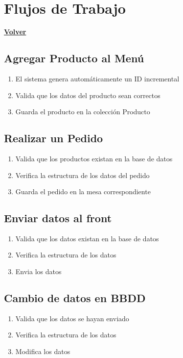 \documentclass[12pt]{article}
\begin{document}
\clearpage

\section{Flujos de Trabajo}
\hyperlink{anchor-indice}{\textbf{Volver}}\\

\subsection{Agregar Producto al Menú}
\begin{enumerate}
    \item El sistema genera automáticamente un ID incremental
    \item Valida que los datos del producto sean correctos
    \item Guarda el producto en la colección Producto
\end{enumerate}

\subsection{Realizar un Pedido}
\begin{enumerate}
    \item Valida que los productos existan en la base de datos
    \item Verifica la estructura de los datos del pedido
    \item Guarda el pedido en la mesa correspondiente
\end{enumerate}

\subsection{Enviar datos al front}
\begin{enumerate}
    \item Valida que los datos existan en la base de datos
    \item Verifica la estructura de los datos
    \item Envia los datos
\end{enumerate}

\subsection{Cambio de datos en BBDD}
\begin{enumerate}
    \item Valida que los datos se hayan enviado
    \item Verifica la estructura de los datos
    \item Modifica los datos
\end{enumerate}
\end{document}
